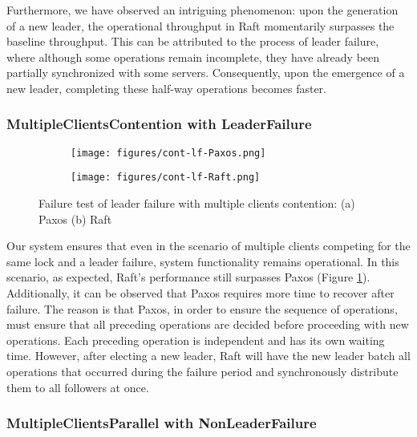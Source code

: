 \documentclass[11pt,a4paper]{article}
\begin{document}
Furthermore, we have observed an intriguing phenomenon: upon the generation of a new leader, the operational throughput in Raft momentarily surpasses the baseline throughput. This can be attributed to the process of leader failure, where although some operations remain incomplete, they have already been partially synchronized with some servers. Consequently, upon the emergence of a new leader, completing these half-way operations becomes faster.

\subsubsection{MultipleClientsContention with LeaderFailure}

\begin{figure}[!ht]
    \begin{subfigure}{0.49\textwidth}
        \texttt{[image: figures/cont-lf-Paxos.png]}
        \caption{}
    \end{subfigure}
    \begin{subfigure}{0.49\textwidth}
        \texttt{[image: figures/cont-lf-Raft.png]}
        \caption{}
    \end{subfigure}
    \caption{Failure test of leader failure with multiple clients contention: (a) Paxos (b) Raft}
    \label{fig:failure_LeaderFailure_MultipleClientsContention}
\end{figure}

Our system ensures that even in the scenario of multiple clients competing for the same lock and a leader failure, system functionality remains operational. In this scenario, as expected, Raft's performance still surpasses Paxos (Figure \ref{fig:failure_LeaderFailure_MultipleClientsContention}). Additionally, it can be observed that Paxos requires more time to recover after failure. The reason is that Paxos, in order to ensure the sequence of operations, must ensure that all preceding operations are decided before proceeding with new operations. Each preceding operation is independent and has its own waiting time. However, after electing a new leader, Raft will have the new leader batch all operations that occurred during the failure period and synchronously distribute them to all followers at once.

\subsubsection{MultipleClientsParallel with NonLeaderFailure}
\end{document}

